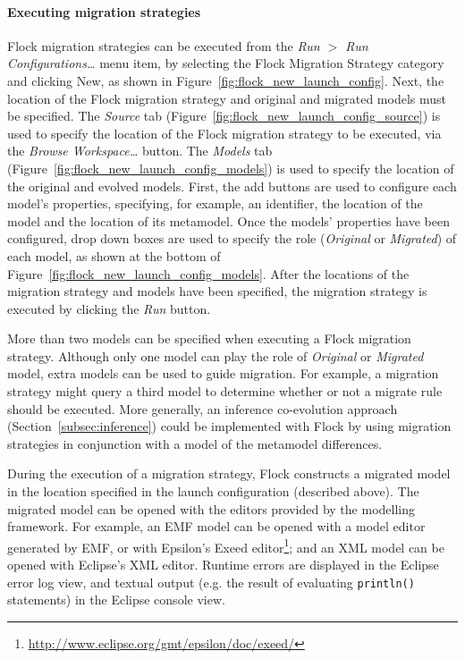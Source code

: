 \paragraph{Executing migration strategies} Flock migration strategies can be executed from the \emph{Run $>$ Run Configurations\ldots} menu item, by selecting the Flock Migration Strategy category and clicking New, as shown in Figure~\ref{fig:flock_new_launch_config}. Next, the location of the Flock migration strategy and original and migrated models must be specified. The \emph{Source} tab (Figure~\ref{fig:flock_new_launch_config_source}) is used to specify the location of the Flock migration strategy to be executed, via the  \emph{Browse Workspace\ldots} button. The \emph{Models} tab (Figure~\ref{fig:flock_new_launch_config_models}) is used to specify the location of the original and evolved models. First, the add buttons are used to configure each model's properties, specifying, for example, an identifier, the location of the model and the location of its metamodel. Once the models' properties have been configured, drop down boxes are used to specify the role (\emph{Original} or \emph{Migrated}) of each model, as shown at the bottom of   Figure~\ref{fig:flock_new_launch_config_models}. After the locations of the migration strategy and models have been specified, the migration strategy is executed by clicking the \emph{Run} button.

More than two models can be specified when executing a Flock migration strategy. Although only one model can play the role of \emph{Original} or \emph{Migrated} model, extra models can be used to guide migration. For example, a migration strategy might query a third model to determine whether or not a migrate rule should be executed. More generally, an inference co-evolution approach (Section~\ref{subsec:inference}) could be implemented with Flock by using migration strategies in conjunction with a model of the metamodel differences. 

During the execution of a migration strategy, Flock constructs a migrated model in the location specified in the launch configuration (described above). The migrated model can be opened with the editors provided by the modelling framework. For example, an EMF model can be opened with a model editor generated by EMF, or with Epsilon's Exeed editor\footnote{\url{http://www.eclipse.org/gmt/epsilon/doc/exeed/}}; and an XML model can be opened with Eclipse's XML editor. Runtime errors are displayed in the Eclipse error log view, and textual output (e.g. the result of evaluating \texttt{pr\-in\-t\-ln()} statements) in the Eclipse console view.

